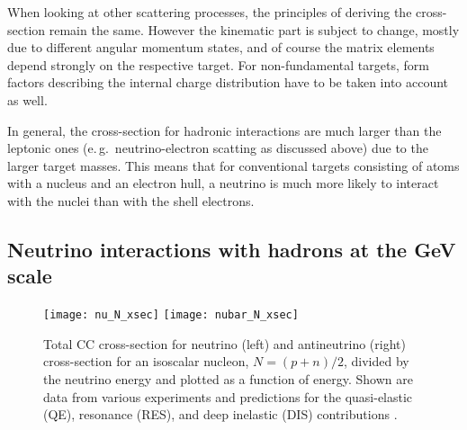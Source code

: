 
When looking at other scattering processes, the principles of deriving the
cross-section remain the same. However the kinematic part is subject to change,
mostly due to different angular momentum states, and of course the matrix
elements depend strongly on the respective target. For non-fundamental targets,
form factors describing the internal charge distribution have to be taken
into account as well.

In general, the cross-section for hadronic interactions are much larger than the
leptonic ones (e.\,g.\ neutrino-electron scatting as discussed above) due to the
larger target masses. This means that for conventional targets consisting of
atoms with a nucleus and an electron hull, a neutrino is much more likely to
interact with the nuclei than with the shell electrons.

\subsection{Neutrino interactions with hadrons at the GeV scale}
\label{sec:XsecsGeV}

\begin{figure}
\centering
  \subfloat
    {\texttt{[image: nu\_N\_xsec]}}\qquad
  \subfloat
    {\texttt{[image: nubar\_N\_xsec]}}
  \caption{Total CC cross-section for neutrino (left) and antineutrino
   (right) cross-section for an isoscalar nucleon, $N=(p+n)/2$, divided by the
   neutrino energy and plotted as a function of energy. Shown are data from
   various experiments and predictions for the quasi-elastic (QE), resonance
   (RES), and deep inelastic (DIS) contributions \cite{NuXsec_review}.}
\label{fig:NuXsec_GeV}
\end{figure}


